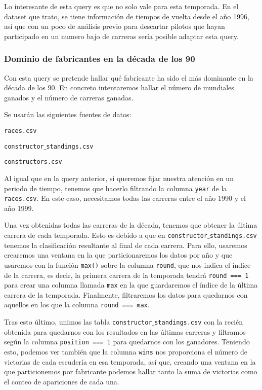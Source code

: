 \documentclass[12pt,twoside,titlepage]{report}
\begin{document}
Lo interesante de esta query es que no solo vale para esta temporada. En el dataset que trato, se tiene información de tiempos de vuelta desde el año 1996, así que con un poco de análisis previo para descartar pilotos que hayan participado en un numero bajo de carreras sería posible adaptar esta query.


\subsubsection{Dominio de fabricantes en la década de los 90}

Con esta query se pretende hallar qué fabricante ha sido el más dominante en la década de los 90. En concreto intentaremos hallar el número de mundiales ganados y el número de carreras ganadas.

Se usarán las siguientes fuentes de datos:
\begin{compactitem}
  \item \texttt{races.csv}
  \item \texttt{constructor$\_$standings.csv}
  \item \texttt{constructors.csv}
\end{compactitem}

Al igual que en la query anterior, si queremos fijar nuestra atención en un periodo de tiempo, tenemos que hacerlo filtrando la columna \texttt{year} de la \texttt{races.csv}. En este caso, necesitamos todas las carreras entre el año 1990 y el año 1999.

Una vez obtenidas todas las carreras de la década, tenemos que obtener la última carrera de cada temporada. Esto es debido a que en \newline\texttt{constructor$\_$standings.csv} tenemos la clasificación resultante al final de cada carrera. Para ello, usaremos crearemos una ventana en la que particionaremos los datos por año y que usaremos con la función \texttt{max()} sobre la columna \texttt{round}, que nos indica el índice de la carrera, es decir, la primera carrera de la temporada tendrá \texttt{round === 1} para crear una columna llamada \texttt{max} en la que guardaremos el índice de la última carrera de la temporada. Finalmente, filtraremos los datos para quedarnos con aquellos en los que la columna \texttt{round === max}.

Tras esto último, unimos las tabla \texttt{constructor$\_$standings.csv} con la recién obtenida para quedarnos con los resultados en las últimas carreras y filtramos según la columna \texttt{position === 1} para quedarnos con los ganadores. Teniendo esto, podemos ver también que la columna \texttt{wins} nos proporciona el número de victorias de cada escudería en esa temporada, así que, creando una ventana en la que particionemos por fabricante podemos hallar tanto la suma de victorias como el conteo de apariciones de cada una. 
\end{document}
